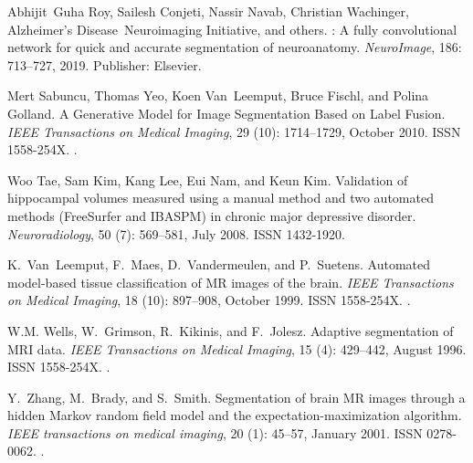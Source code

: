 \documentclass{midl}
\begin{document}
\begin{thebibliography}{50}
Abhijit~Guha Roy, Sailesh Conjeti, Nassir Navab, Christian Wachinger,
  Alzheimer's Disease~Neuroimaging Initiative, and {others}.
: {A} fully convolutional network for quick and accurate
  segmentation of neuroanatomy.
\newblock \emph{NeuroImage}, 186: 713--727, 2019.
\newblock Publisher: Elsevier.

Mert Sabuncu, Thomas Yeo, Koen Van~Leemput, Bruce Fischl, and Polina Golland.
\newblock A {Generative} {Model} for {Image} {Segmentation} {Based} on {Label}
  {Fusion}.
\newblock \emph{IEEE Transactions on Medical Imaging}, 29
  (10): 1714--1729, October 2010.
\newblock ISSN 1558-254X.
\newblock {}.

Woo Tae, Sam Kim, Kang Lee, Eui Nam, and Keun Kim.
\newblock Validation of hippocampal volumes measured using a manual method and
  two automated methods ({FreeSurfer} and {IBASPM}) in chronic major depressive
  disorder.
\newblock \emph{Neuroradiology}, 50 (7): 569--581, July 2008.
\newblock ISSN 1432-1920.

K.~Van~Leemput, F.~Maes, D.~Vandermeulen, and P.~Suetens.
\newblock Automated model-based tissue classification of {MR} images of the
  brain.
\newblock \emph{IEEE Transactions on Medical Imaging}, 18
  (10): 897--908, October 1999.
\newblock ISSN 1558-254X.
\newblock {}.

W.M. Wells, W.~Grimson, R.~Kikinis, and F.~Jolesz.
\newblock Adaptive segmentation of {MRI} data.
\newblock \emph{IEEE Transactions on Medical Imaging}, 15
  (4): 429--442, August 1996.
\newblock ISSN 1558-254X.
\newblock {}.

Y.~Zhang, M.~Brady, and S.~Smith.
\newblock Segmentation of brain {MR} images through a hidden {Markov} random
  field model and the expectation-maximization algorithm.
\newblock \emph{IEEE transactions on medical imaging}, 20
  (1): 45--57, January 2001.
\newblock ISSN 0278-0062.
\newblock {}.


\end{thebibliography}
\end{document}
